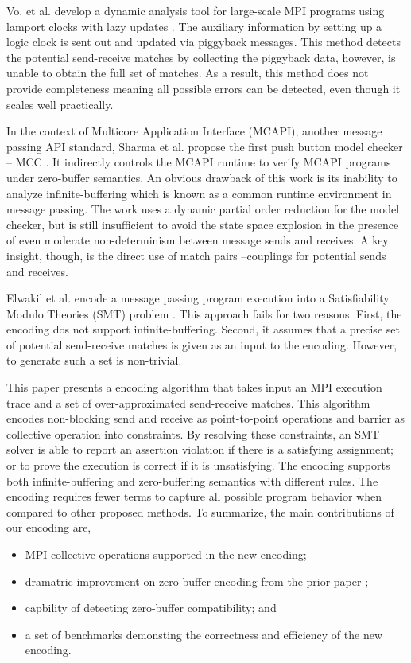 Vo. et al. develop a dynamic analysis tool for large-scale MPI programs using lamport clocks with lazy updates \cite{DBLP:conf/sc/VoAGSSB10, DBLP:conf/IEEEpact/VoGKSSB11}. The auxiliary information by setting up a logic clock is sent out and updated via piggyback messages. This method detects the potential send-receive matches by collecting the piggyback data, however, is unable to obtain the full set of matches. As a result, this method does not provide completeness meaning all possible errors can be detected, even though it scales well practically.

In the context of Multicore Application Interface (MCAPI), another message passing API standard, Sharma et al. propose the first push button model checker -- MCC \cite{DBLP:conf/fmcad/SharmaGMH09}. It indirectly controls the MCAPI runtime to verify MCAPI programs under zero-buffer semantics. An obvious drawback of this work is its inability to analyze infinite-buffering which is known as a common runtime environment in message passing. The work uses a dynamic partial order reduction for the model checker, but is still insufficient to avoid the state space explosion in the presence of even moderate non-determinism between message sends and receives. A key insight, though, is the direct use of match pairs --couplings for potential sends and receives.

Elwakil et al. encode a message passing program execution into a Satisfiability Modulo Theories (SMT) problem \cite{barrett2008satisfiability}. This approach fails for two reasons. First, the encoding dos not support infinite-buffering. Second, it assumes that a precise set of potential send-receive matches is given as an input to the encoding. However, to generate such a set is non-trivial.

This paper presents a encoding algorithm that takes input an MPI execution trace and a set of over-approximated send-receive matches. This algorithm encodes non-blocking send and receive as point-to-point operations and barrier as collective operation into constraints. By resolving these constraints, an SMT solver is able to report an assertion violation if there is a satisfying assignment; or to prove the execution is correct if it is unsatisfying.  The encoding supports both infinite-buffering and zero-buffering semantics with different rules. The encoding requires fewer terms to capture all possible program behavior when compared to other proposed methods. To summarize, the main contributions of our encoding are,
\begin{itemize}
\item  MPI collective operations supported in the new encoding;
\item dramatric improvement on zero-buffer encoding from the prior paper \cite{};
\item capbility of detecting zero-buffer compatibility; and
\item a set of benchmarks demonsting the correctness and efficiency of the new encoding.
\end{itemize}

